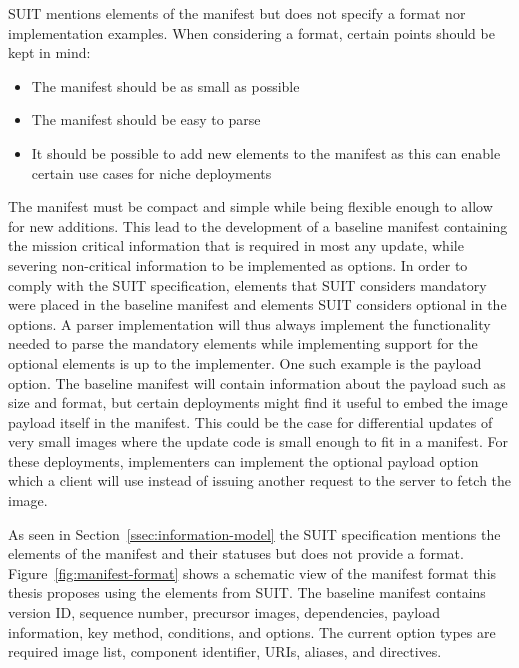 \documentclass[0-thesis.tex]{subfiles}
\begin{document}
SUIT mentions elements of the manifest but does not specify a format nor implementation
examples. When considering a format, certain points should be kept in mind:

\begin{itemize}
        \item The manifest should be as small as possible
        \item The manifest should be easy to parse
        \item It should be possible to add new elements to the manifest as this can enable
                certain use cases for niche deployments
\end{itemize}

The manifest must be compact and simple while being flexible enough to allow for new
additions. This lead to the development of a baseline manifest containing the mission
critical information that is required in most any update, while severing non-critical
information to be implemented as options. In order to comply with the SUIT specification,
elements that SUIT considers mandatory were placed in the baseline manifest and elements
SUIT considers optional in the options. A parser implementation will thus always implement
the functionality needed to parse the mandatory elements while implementing support for
the optional elements is up to the implementer. One such example is the payload option.
The baseline manifest will contain information about the payload such as size and format,
but certain deployments might find it useful to embed the image payload itself in the
manifest. This could be the case for differential updates of very small images where the
update code is small enough to fit in a manifest. For these deployments, implementers can
implement the optional payload option which a client will use instead of issuing another
request to the server to fetch the image.

As seen in Section~\ref{ssec:information-model} the SUIT specification mentions the
elements of the manifest and their statuses but does not provide a format.
Figure~\ref{fig:manifest-format} shows a schematic view of the manifest format this thesis
proposes using the elements from SUIT. The baseline manifest contains version ID, sequence
number, precursor images, dependencies, payload information, key method, conditions, and
options. The current option types are required image list, component identifier, URIs,
aliases, and directives.
\end{document}
